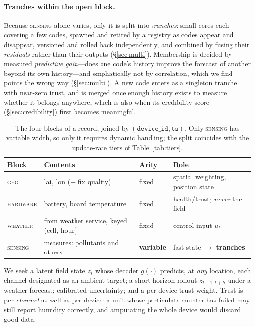 \documentclass[10pt]{article}
\begin{document}
\paragraph{Tranches within the open block.}
Because \textsc{sensing} alone varies, only it is split into \emph{tranches}: small
cores each covering a few codes, spawned and retired by a registry as codes appear
and disappear, versioned and rolled back independently, and combined by fusing
their \emph{residuals} rather than their outputs (\S\ref{sec:multi}). Membership is
decided by measured \emph{predictive gain}---does one code's history improve the
forecast of another beyond its own history---and emphatically not by correlation,
which we find points the wrong way (\S\ref{sec:multi}). A new code enters as a
singleton tranche with near-zero trust, and is merged once enough history exists to
measure whether it belongs anywhere, which is also when its credibility score
(\S\ref{sec:credibility}) first becomes meaningful.

\begin{table}[t]
\centering
\small
\begin{tabular}{@{}llll@{}}
\toprule
Block & Contents & Arity & Role \\
\midrule
\textsc{geo} & lat, lon (+ fix quality) & fixed & spatial weighting, position state \\
\textsc{hardware} & battery, board temperature & fixed & health/trust; \emph{never} the field \\
\textsc{weather} & from weather service, keyed (cell, hour) & fixed & control input $u_t$ \\
\textsc{sensing} & measures: pollutants and others & \textbf{variable} & fast state $\rightarrow$ \textbf{tranches} \\
\bottomrule
\end{tabular}
\caption{The four blocks of a record, joined by
$(\texttt{device\_id},\texttt{ts})$. Only \textsc{sensing} has variable width, so
only it requires dynamic handling; the split coincides with the update-rate tiers
of Table~\ref{tab:tiers}.}
\label{tab:blocks}
\end{table}

We seek a latent field state $z_t$ whose decoder $g(\cdot)$ predicts, at
\emph{any} location, each channel designated as an ambient target; a short-horizon
rollout $z_{t+1{:}t+h}$ under a weather forecast; calibrated uncertainty; and a
per-device trust weight. Trust is per \emph{channel} as well as per device: a unit
whose particulate counter has failed may still report humidity correctly, and
amputating the whole device would discard good data.
\end{document}

